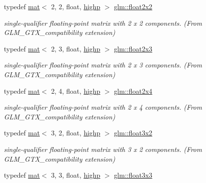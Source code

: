 \begin{DoxyCompactItemize}
typedef \mbox{\hyperlink{structglm_1_1mat}{mat}}$<$ 2, 2, float, \mbox{\hyperlink{namespaceglm_a36ed105b07c7746804d7fdc7cc90ff25ac6f7eab42eacbb10d59a58e95e362074}{highp}} $>$ \mbox{\hyperlink{group__gtx__compatibility_gab3fb1cd56ec3f5407a4d3b9173bd88ae}{glm\+::float2x2}}
\begin{DoxyCompactList}\small\item\em single-\/qualifier floating-\/point matrix with 2 x 2 components. (From G\+L\+M\+\_\+\+G\+T\+X\+\_\+compatibility extension) \end{DoxyCompactList}\item 
typedef \mbox{\hyperlink{structglm_1_1mat}{mat}}$<$ 2, 3, float, \mbox{\hyperlink{namespaceglm_a36ed105b07c7746804d7fdc7cc90ff25ac6f7eab42eacbb10d59a58e95e362074}{highp}} $>$ \mbox{\hyperlink{group__gtx__compatibility_ga32644dc8b8177c22355e4d03b06061ac}{glm\+::float2x3}}
\begin{DoxyCompactList}\small\item\em single-\/qualifier floating-\/point matrix with 2 x 3 components. (From G\+L\+M\+\_\+\+G\+T\+X\+\_\+compatibility extension) \end{DoxyCompactList}\item 
typedef \mbox{\hyperlink{structglm_1_1mat}{mat}}$<$ 2, 4, float, \mbox{\hyperlink{namespaceglm_a36ed105b07c7746804d7fdc7cc90ff25ac6f7eab42eacbb10d59a58e95e362074}{highp}} $>$ \mbox{\hyperlink{group__gtx__compatibility_gadd10766e2393a0e0eaf91ae4d2e85f35}{glm\+::float2x4}}
\begin{DoxyCompactList}\small\item\em single-\/qualifier floating-\/point matrix with 2 x 4 components. (From G\+L\+M\+\_\+\+G\+T\+X\+\_\+compatibility extension) \end{DoxyCompactList}\item 
typedef \mbox{\hyperlink{structglm_1_1mat}{mat}}$<$ 3, 2, float, \mbox{\hyperlink{namespaceglm_a36ed105b07c7746804d7fdc7cc90ff25ac6f7eab42eacbb10d59a58e95e362074}{highp}} $>$ \mbox{\hyperlink{group__gtx__compatibility_ga8e7b0c3f63f470d7a7913453194b0c99}{glm\+::float3x2}}
\begin{DoxyCompactList}\small\item\em single-\/qualifier floating-\/point matrix with 3 x 2 components. (From G\+L\+M\+\_\+\+G\+T\+X\+\_\+compatibility extension) \end{DoxyCompactList}\item 
typedef \mbox{\hyperlink{structglm_1_1mat}{mat}}$<$ 3, 3, float, \mbox{\hyperlink{namespaceglm_a36ed105b07c7746804d7fdc7cc90ff25ac6f7eab42eacbb10d59a58e95e362074}{highp}} $>$ \mbox{\hyperlink{group__gtx__compatibility_ga0c6bbdaa1ebe76fbb55a77d5ca0e2846}{glm\+::float3x3}}

\end{DoxyCompactItemize}
